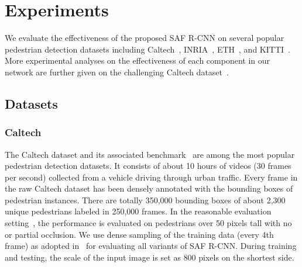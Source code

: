 \documentclass[journal]{IEEEtran}
\begin{document}
\section{Experiments}
We evaluate the effectiveness of the proposed SAF R-CNN on several popular pedestrian detection datasets including Caltech~\cite{dollar2012pedestrian}, INRIA~\cite{dalal2005histograms}, ETH~\cite{ess2007depth}, and KITTI~\cite{geiger2012we}. More experimental analyses on the effectiveness of each component in our network are further given on the challenging Caltech dataset~\cite{dollar2012pedestrian}.

\subsection{Datasets}
\subsubsection{Caltech}
The Caltech dataset and its associated benchmark~\cite{dollar2012pedestrian} are among the most popular pedestrian detection datasets. It consists of about 10 hours of  videos (30 frames per second) collected from a vehicle driving through urban traffic. Every frame in the raw Caltech dataset has been densely annotated with the bounding boxes of pedestrian instances. There are totally 350,000 bounding boxes of about 2,300 unique pedestrians labeled in 250,000 frames. In the reasonable evaluation setting~\cite{dollar2012pedestrian}, the performance is evaluated on pedestrians over 50 pixels tall with no or partial occlusion. We use dense sampling of the training data (every 4th frame) as adopted in~\cite{compact,nam2014local} for evaluating all variants of SAF R-CNN. During training and testing, the scale of the input image is set as $800$ pixels on the shortest side. 
\end{document}
